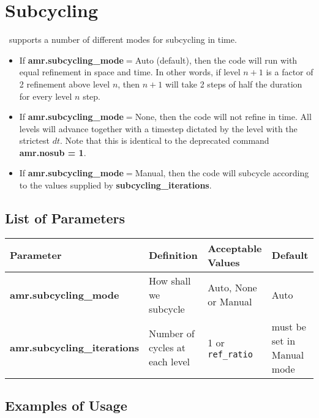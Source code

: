 \section{Subcycling}
\nyx\ supports a number of different modes for subcycling in time.

\begin{itemize}
\item If {\bf amr.subcycling\_mode}$ = $Auto (default), then the code 
will run with equal refinement in space and time. In other words, if 
level $n+1$ is a factor of 2 refinement above level $n$, then $n+1$ 
will take 2 steps of half the duration for every level $n$ step.

\item If {\bf amr.subcycling\_mode}$ = $None, then the code 
will not refine in time. All levels will advance together with a 
timestep dictated by the level with the strictest $dt$. Note that this 
is identical to the deprecated command {\bf amr.nosub = 1}.

\item If {\bf amr.subcycling\_mode}$ = $Manual, then the code will 
subcycle according to the values supplied by {\bf 
subcycling\_iterations}.

\end{itemize}

\subsection{List of Parameters}

\begin{table*}[h]
\begin{scriptsize}
\begin{center}
\begin{tabular}{|l|l|l|l|} \hline
Parameter & Definition & Acceptable Values &Default\\
\hline
{\bf amr.subcycling\_mode}& How shall we subcycle &Auto, None or Manual & Auto \\ 
{\bf amr.subcycling\_iterations} & Number of cycles at each level & 1 
or {\tt ref\_ratio} & must be set in Manual mode \\ 
\hline
\end{tabular}
\end{center}
\end{scriptsize}
\end{table*}

\subsection{Examples of Usage}

